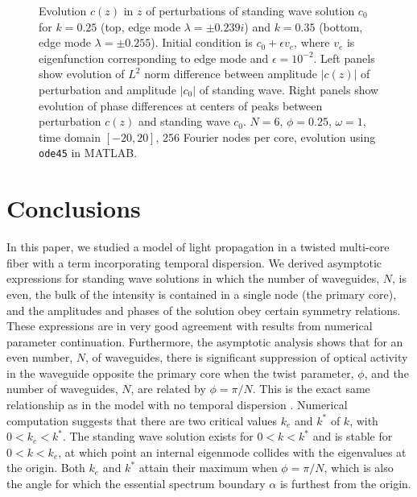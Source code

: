 \documentclass[11pt,reqno]{amsart}
\begin{document}
\begin{figure}
    \caption{Evolution $c(z)$ in $z$ of perturbations of standing wave solution $c_0$ for $k = 0.25$ (top, edge mode $\lambda = \pm 0.239i$) and $k = 0.35$ (bottom, edge mode $\lambda = \pm 0.255$). Initial condition is $c_0 + \epsilon v_e$, where $v_e$ is eigenfunction corresponding to edge mode and $\epsilon = 10^{-2}$. Left panels show evolution of $L^2$ norm difference between amplitude $|c(z)|$ of perturbation and amplitude $|c_0|$ of standing wave. Right panels show evolution of phase differences at centers of peaks between perturbation $c(z)$ and standing wave $c_0$. $N=6$, $\phi = 0.25$, $\omega=1$, time domain $[-20,20]$, 256 Fourier nodes per core, evolution using \texttt{ode45} in MATLAB.}
    \label{fig:evolz1}
\end{figure}

\section{Conclusions}

In this paper, we studied a model of light propagation in a twisted multi-core fiber with a term incorporating temporal dispersion. We derived asymptotic expressions for standing wave solutions in which the number of waveguides, $N$, is even, the bulk of the intensity is contained in a single node (the primary core), and the amplitudes and phases of the solution obey certain symmetry relations. These expressions are in very good agreement with results from numerical parameter continuation. Furthermore, the asymptotic analysis shows that for an even number, $N$, of waveguides, there is significant suppression of optical activity in the waveguide opposite the primary core when the twist parameter, $\phi$, and the number of waveguides, $N$, are related by $\phi = \pi/N$. This is the exact same relationship as in the model with no temporal dispersion \cite{parker2021}.
Numerical computation suggests that there are two critical values $k_e$ and $k^*$ of $k$, with $0 < k_e < k^*$. The standing wave solution exists for $0 < k < k^*$ and is stable for $0 < k < k_e$, at which point an internal eigenmode collides with the eigenvalues at the origin. Both $k_e$ and $k^*$ attain their maximum when $\phi = \pi/N$, which is also the angle for which the essential spectrum boundary $\alpha$ is furthest from the origin.
\end{document}
